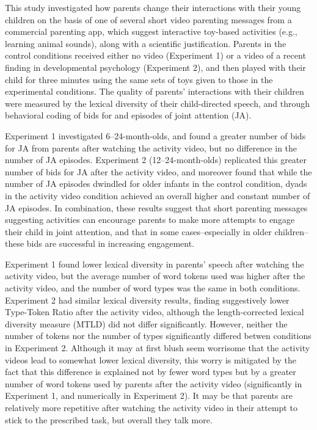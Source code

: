 \documentclass[man,floatsintext]{apa6}
\begin{document}
This study investigated how parents change their interactions with their young children on the basis of one of several short video parenting messages from a commercial parenting app, which suggest interactive toy-based activities (e.g., learning animal sounds), along with a scientific justification.
Parents in the control conditions received either no video (Experiment 1) or a video of a recent finding in developmental psychology (Experiment 2), and then played with their child for three minutes using the same sets of toys given to those in the experimental conditions.
The quality of parents' interactions with their children were measured by the lexical diversity of their child-directed speech, and through behavioral coding of bids for and episodes of joint attention (JA).

Experiment 1 investigated 6--24-month-olds, and found a greater number of bids for JA from parents after watching the activity video, but no difference in the number of JA episodes.
Experiment 2 (12--24-month-olds) replicated this greater number of bids for JA after the activity video, and moreover found that while the number of JA episodes dwindled for older infants in the control condition, dyads in the activity video condition achieved an overall higher and constant number of JA episodes.
In combination, these results suggest that short parenting messages suggesting activities can encourage parents to make more attempts to engage their child in joint attention, and that in some cases--especially in older children--these bids are successful in increasing engagement.

Experiment 1 found lower lexical diversity in parents' speech after watching the activity video, but the average number of word tokens used was higher after the activity video, and the number of word types was the same in both conditions.
Experiment 2 had similar lexical diversity results, finding suggestively lower Type-Token Ratio after the activity video, although the length-corrected lexical diversity measure (MTLD) did not differ significantly.
However, neither the number of tokens nor the number of types significantly differed betwen conditions in Experiment 2.
Although it may at first blush seem worrisome that the activity videos lead to somewhat lower lexical diversity, this worry is mitigated by the fact that this difference is explained not by fewer word types but by a greater number of word tokens used by parents after the activity video (significantly in Experiment 1, and numerically in Experiment 2).
It may be that parents are relatively more repetitive after watching the activity video in their attempt to stick to the prescribed task, but overall they talk more.
\end{document}

